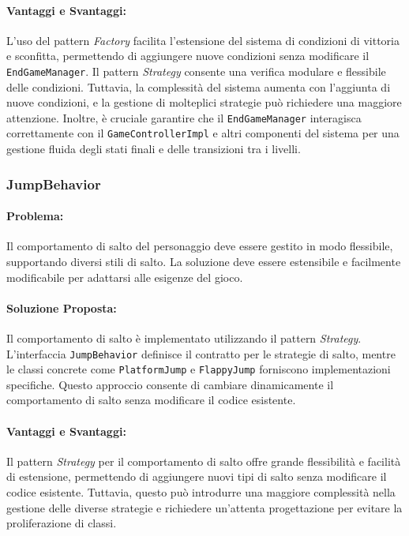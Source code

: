 \documentclass[a4paper,12pt]{report}
\begin{document}
	\paragraph{Vantaggi e Svantaggi:} 
	L'uso del pattern \textit{Factory} facilita l'estensione del sistema di condizioni di vittoria e sconfitta, permettendo di aggiungere nuove condizioni senza modificare il \texttt{EndGameManager}. Il pattern \textit{Strategy} consente una verifica modulare e flessibile delle condizioni. Tuttavia, la complessità del sistema aumenta con l'aggiunta di nuove condizioni, e la gestione di molteplici strategie può richiedere una maggiore attenzione. Inoltre, è cruciale garantire che il \texttt{EndGameManager} interagisca correttamente con il \texttt{GameControllerImpl} e altri componenti del sistema per una gestione fluida degli stati finali e delle transizioni tra i livelli.
	
	\subsubsection{JumpBehavior}
	
	\paragraph{Problema:} Il comportamento di salto del personaggio deve essere gestito in modo flessibile, supportando diversi stili di salto. La soluzione deve essere estensibile e facilmente modificabile per adattarsi alle esigenze del gioco.
	
	\paragraph{Soluzione Proposta:} Il comportamento di salto è implementato utilizzando il pattern \textit{Strategy}. L'interfaccia \texttt{JumpBehavior} definisce il contratto per le strategie di salto, mentre le classi concrete come \texttt{PlatformJump} e \texttt{FlappyJump} forniscono implementazioni specifiche. Questo approccio consente di cambiare dinamicamente il comportamento di salto senza modificare il codice esistente.
	
	\paragraph{Vantaggi e Svantaggi:} 
	Il pattern \textit{Strategy} per il comportamento di salto offre grande flessibilità e facilità di estensione, permettendo di aggiungere nuovi tipi di salto senza modificare il codice esistente. Tuttavia, questo può introdurre una maggiore complessità nella gestione delle diverse strategie e richiedere un'attenta progettazione per evitare la proliferazione di classi.
	
\end{document}
